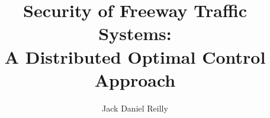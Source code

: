 \title{Security of Freeway Traffic Systems:\\A Distributed Optimal Control Approach}
\author{Jack Daniel Reilly}






\prevdegrees{}



\maketitle

\copyrightpage
\listoftodos

\begin{abstract}

\end{abstract}

\begin{frontmatter}
\renewcommand{\thepage}{\roman{page}}
\setcounter{page}{1}

\begin{dedication}
\null\vfil
{\large
\begin{center}

\end{center}}
\null\vfil
\end{dedication}

\tableofcontents
\listoffigures
\listoftables


\begin{acknowledgements}

\end{acknowledgements}

\clearpage

\end{frontmatter}